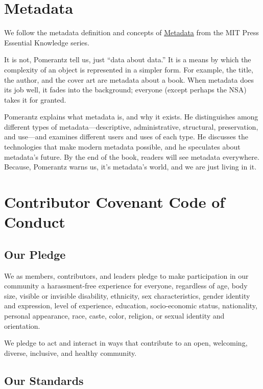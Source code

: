 \documentclass[
  fontsize=13pt,
  english,
  a4paper,
  openany, a4paper, oneside]{article}
\begin{document}
\hypertarget{metadata}{%
\section{Metadata}\label{metadata}}

We follow the metadata definition and concepts of \href{https://mitpress.mit.edu/books/metadata}{Metadata} from the MIT Press Essential Knowledge series.

It is not, Pomerantz tell us, just ``data about data.'' It is a means by which the complexity of an object is represented in a simpler form. For example, the title, the author, and the cover art are metadata about a book. When metadata does its job well, it fades into the background; everyone (except perhaps the NSA) takes it for granted.

Pomerantz explains what metadata is, and why it exists. He distinguishes among different types of metadata---descriptive, administrative, structural, preservation, and use---and examines different users and uses of each type. He discusses the technologies that make modern metadata possible, and he speculates about metadata's future. By the end of the book, readers will see metadata everywhere. Because, Pomerantz warns us, it's metadata's world, and we are just living in it.

\hypertarget{covenant}{%
\section{Contributor Covenant Code of Conduct}\label{covenant}}

\hypertarget{our-pledge}{%
\subsection{Our Pledge}\label{our-pledge}}

We as members, contributors, and leaders pledge to make participation in our
community a harassment-free experience for everyone, regardless of age, body
size, visible or invisible disability, ethnicity, sex characteristics, gender
identity and expression, level of experience, education, socio-economic status,
nationality, personal appearance, race, caste, color, religion, or sexual identity and orientation.

We pledge to act and interact in ways that contribute to an open, welcoming,
diverse, inclusive, and healthy community.

\hypertarget{our-standards}{%
\subsection{Our Standards}\label{our-standards}}
\end{document}
